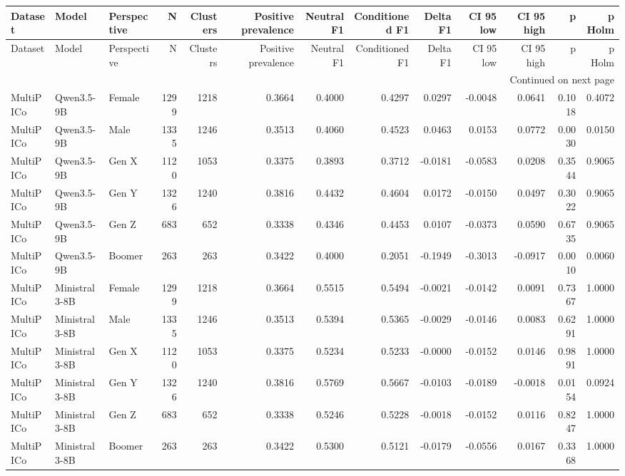 \begin{longtable}{lllrrrrrrrrrr}
\toprule
Dataset & Model & Perspective & N & Clusters & Positive prevalence & Neutral F1 & Conditioned F1 & Delta F1 & CI 95 low & CI 95 high & p & p Holm \\
\midrule
\endfirsthead
\toprule
Dataset & Model & Perspective & N & Clusters & Positive prevalence & Neutral F1 & Conditioned F1 & Delta F1 & CI 95 low & CI 95 high & p & p Holm \\
\midrule
\endhead
\midrule
\multicolumn{13}{r}{Continued on next page} \\
\midrule
\endfoot
\bottomrule
\endlastfoot
MultiPICo & Qwen3.5-9B & Female & 1299 & 1218 & 0.3664 & 0.4000 & 0.4297 & 0.0297 & -0.0048 & 0.0641 & 0.1018 & 0.4072 \\
MultiPICo & Qwen3.5-9B & Male & 1335 & 1246 & 0.3513 & 0.4060 & 0.4523 & 0.0463 & 0.0153 & 0.0772 & 0.0030 & 0.0150 \\
MultiPICo & Qwen3.5-9B & Gen X & 1120 & 1053 & 0.3375 & 0.3893 & 0.3712 & -0.0181 & -0.0583 & 0.0208 & 0.3544 & 0.9065 \\
MultiPICo & Qwen3.5-9B & Gen Y & 1326 & 1240 & 0.3816 & 0.4432 & 0.4604 & 0.0172 & -0.0150 & 0.0497 & 0.3022 & 0.9065 \\
MultiPICo & Qwen3.5-9B & Gen Z & 683 & 652 & 0.3338 & 0.4346 & 0.4453 & 0.0107 & -0.0373 & 0.0590 & 0.6735 & 0.9065 \\
MultiPICo & Qwen3.5-9B & Boomer & 263 & 263 & 0.3422 & 0.4000 & 0.2051 & -0.1949 & -0.3013 & -0.0917 & 0.0010 & 0.0060 \\
MultiPICo & Ministral3-8B & Female & 1299 & 1218 & 0.3664 & 0.5515 & 0.5494 & -0.0021 & -0.0142 & 0.0091 & 0.7367 & 1.0000 \\
MultiPICo & Ministral3-8B & Male & 1335 & 1246 & 0.3513 & 0.5394 & 0.5365 & -0.0029 & -0.0146 & 0.0083 & 0.6291 & 1.0000 \\
MultiPICo & Ministral3-8B & Gen X & 1120 & 1053 & 0.3375 & 0.5234 & 0.5233 & -0.0000 & -0.0152 & 0.0146 & 0.9891 & 1.0000 \\
MultiPICo & Ministral3-8B & Gen Y & 1326 & 1240 & 0.3816 & 0.5769 & 0.5667 & -0.0103 & -0.0189 & -0.0018 & 0.0154 & 0.0924 \\
MultiPICo & Ministral3-8B & Gen Z & 683 & 652 & 0.3338 & 0.5246 & 0.5228 & -0.0018 & -0.0152 & 0.0116 & 0.8247 & 1.0000 \\
MultiPICo & Ministral3-8B & Boomer & 263 & 263 & 0.3422 & 0.5300 & 0.5121 & -0.0179 & -0.0556 & 0.0167 & 0.3368 & 1.0000 \\

\end{longtable}
